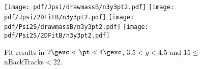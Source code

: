 \begin{figure}[H]
\begin{center}
\texttt{[image: pdf/Jpsi/drawmassB/n3y3pt2.pdf]}
\texttt{[image: pdf/Jpsi/2DFitB/n3y3pt2.pdf]}
\vspace*{-0.5cm}
\texttt{[image: pdf/Psi2S/drawmassB/n3y3pt2.pdf]}
\texttt{[image: pdf/Psi2S/2DFitB/n3y3pt2.pdf]}
\vspace*{-0.5cm}
\end{center}
\caption{Fit results in $2\gevc<\pt<4\gevc$, $3.5<y<4.5$ and 15$\leq$nBackTracks$<$22.}
\label{Fitn3y3pt2}
\end{figure}
